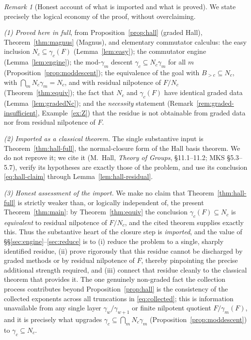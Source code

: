 \documentclass{amsart}
\theoremstyle{definition}
\theoremstyle{remark}
\newtheorem{remark}{Remark}
\begin{document}
\begin{remark}[Honest account of what is imported and what is proved]
\label{rem:honest}
We state precisely the logical economy of the proof, without overclaiming.

\emph{(1) Proved here in full}, from Proposition~\ref{prop:hall} (graded Hall),
Theorem~\ref{thm:magnus} (Magnus), and elementary commutator calculus:
the easy inclusion $N_c\subseteq\gamma_c(F)$ (Lemma~\ref{lem:easy}); the
commutator engine (Lemma~\ref{lem:engine}); the mod-$\gamma_m$ descent
$\gamma_c\subseteq N_c\gamma_m$ for all $m$ (Proposition~\ref{prop:moddescent});
the equivalence of the goal with $B_{>c}\subseteq N_c$, with
$\bigcap_m N_c\gamma_m=N_c$, and with residual nilpotence of $F/N_c$
(Theorem~\ref{thm:equiv}); the fact that $N_c$ and $\gamma_c(F)$ have identical
graded data (Lemma~\ref{lem:gradedNc}); and the \emph{necessity} statement
(Remark~\ref{rem:graded-insufficient}, Example~\ref{ex:Z}) that the residue is not
obtainable from graded data nor from residual nilpotence of $F$.

\emph{(2) Imported as a classical theorem.} The single substantive input is
Theorem~\ref{thm:hall-full}, the normal-closure form of the Hall basis theorem.
We do not reprove it; we cite it (M.\ Hall, \emph{Theory of Groups}, \S11.1--11.2;
MKS \S5.3--5.7), verify its hypotheses are exactly those of the problem, and use
its conclusion \eqref{eq:hall-claim} through Lemma~\ref{lem:hall-residual}.

\emph{(3) Honest assessment of the import.} We make no claim that
Theorem~\ref{thm:hall-full} is strictly weaker than, or logically independent of,
the present Theorem~\ref{thm:main}: by Theorem~\ref{thm:equiv} the conclusion
$\gamma_c(F)\subseteq N_c$ is \emph{equivalent} to residual nilpotence of $F/N_c$,
and the cited theorem supplies exactly this. Thus the substantive heart of the
closure step is \emph{imported}, and the value of \S\S\ref{sec:engine}--\ref{sec:reduce}
is to (i) reduce the problem to a single, sharply identified residue, (ii) prove
rigorously that this residue cannot be discharged by graded methods or by residual
nilpotence of $F$, thereby pinpointing the precise additional strength required,
and (iii) connect that residue cleanly to the classical theorem that provides it.
The one genuinely non-graded fact the collection process contributes beyond
Proposition~\ref{prop:hall} is the consistency of the collected exponents across
all truncations in \eqref{eq:collected}; this is information unavailable from any
single layer $\gamma_w/\gamma_{w+1}$ or finite nilpotent quotient
$F/\gamma_m(F)$, and it is precisely what upgrades
$\gamma_c\subseteq\bigcap_m N_c\gamma_m$ (Proposition~\ref{prop:moddescent}) to
$\gamma_c\subseteq N_c$.
\end{remark}
\end{document}
